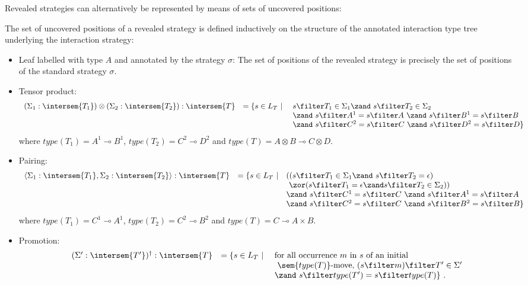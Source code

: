 Revealed strategies can alternatively be represented by means of
sets of uncovered positions:
\begin{definition}
\label{dfn:revealedstrat}
The set of uncovered positions of a revealed strategy is defined inductively on the
structure of the annotated interaction type tree underlying the
interaction strategy:
\begin{itemize}[-]
\item Leaf labelled with type $A$ and annotated by the strategy $\sigma$: The set of positions of the revealed strategy is precisely the set of positions of the standard strategy $\sigma$.


\item Tensor product: $$\begin{array}{lcll}
(\Sigma_1 : \intersem{T_1}) \otimes (\Sigma_2 : \intersem{T_2}) : \intersem{T} &=\{ s \in L_T \ | \  &s \filter T_1 \in \Sigma_1 \zand\ s \filter T_2 \in \Sigma_2 \\
&& \zand\ s\filter A^1 = s\filter A\ \zand\ s\filter B^1 = s\filter B \\
&& \zand\ s\filter C^2 = s\filter C\ \zand\ s\filter D^2 =
s\filter D \}
\end{array}$$
where $type(T_1) = A^1\multimap B^1$,
$type(T_2) = C^2\multimap D^2$
and $type(T) = A\otimes B \multimap C \otimes D$.

\item Pairing: $$\begin{array}{lcll}
\langle \Sigma_1 : \intersem{T_1}, \Sigma_2 : \intersem{T_2} \rangle : \intersem{T} &= \{ s \in L_T \ | &
   ( (s \filter T_1 \in \Sigma_1 \zand\ s \filter T_2 = \epsilon) \\
&&  \   \zor ( s \filter T_1 = \epsilon \zand s \filter T_2 \in \Sigma_2)) \\
&& \zand\ s\filter C^1 = s\filter C\ \zand\ s\filter A^1= s\filter A  \\
&& \zand\ s\filter C^2 = s\filter C\ \zand\ s\filter B^2 =
s\filter B  \}
\end{array}$$
where $type(T_1) = C^1\multimap A^1$,
$type(T_2) = C^2\multimap B^2$
and $type(T) = C\multimap A \times B$.

\item Promotion: $$\begin{array}{lcll}
(\Sigma' : \intersem{T'})^\dagger : \intersem{T} &= \{ s \in L_T \ | \ &
\mbox {for all occurrence $m$ in $s$ of an initial  }\\
&& \mbox{ $\sem{type(T)}$-move, $(s \filter m) \filter T' \in \Sigma'$} \\
&& \zand\ s\filter type(T') = s\filter type(T) \} \ .
\end{array}$$


\end{itemize}
\end{definition}
